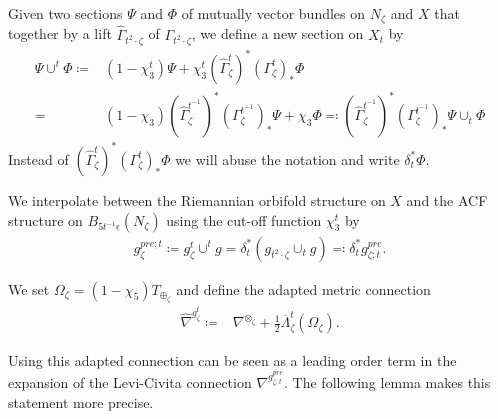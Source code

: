 \documentclass[psamsfonts]{amsart}
\theoremstyle{plain}
\theoremstyle{definition}{
\newtheorem{defi}{Definition}[section]
\newtheorem{ass}{Assumption}
\newtheorem*{nota}{Notation}}
\theoremstyle{remark}{
\newtheorem{rem}{Remark}
\newtheorem{ex}{Example}}
\theoremstyle{plain}{
\newtheorem{thm}{Theorem}[section]
\newtheorem{lem}{Lemma}[section]
\newtheorem{cor}{Corollary}[section]
\newtheorem{prop}{Proposition}[section]
\newtheorem{con}{Conjecture}[section]}
\newcommand{\und}[1]{\hspace{#1}\text{and}\hspace{#1}}
\begin{document}
\begin{nota}
Given two sections $\Psi$ and $\Phi$ of mutually vector bundles on $N_\zeta$ and $X$ that  together by a lift $\hat{\Gamma}_{t^2\cdot\zeta}$ of $ \Gamma_{t^2\cdot\zeta}$, we define a new section on $X_t$ by
\begin{align*}
    \Psi\cup^t\Phi\coloneqq&(1-\chi^t_3)\Psi+\chi^t_3(\hat{\Gamma}^t_\zeta)^*( \Gamma^t_\zeta)_*\Phi\\
    =&(1-\chi_3)(\hat{\Gamma}^{t^{-1}}_\zeta)^*( \Gamma^{t^{-1}}_\zeta)_*\Psi+\chi_3\Phi\eqqcolon (\hat{\Gamma}^{t^{-1}}_\zeta)^*( \Gamma^{t^{-1}}_\zeta)_*\Psi\cup_t\Phi
\end{align*}
Instead of $(\hat{\Gamma}^t_\zeta)^*( \Gamma^t_\zeta)_*\Phi$ we will abuse the notation and write $\delta_t^*\Phi$.
\end{nota}

\begin{defi}
    We interpolate between the Riemannian orbifold structure on $X$ and the ACF structure on $B_{5t^{-1}\epsilon}(N_\zeta)$ using the cut-off function ${\chi^t_3}$ by
\begin{align*}
    g^{pre;t}_\zeta\coloneqq g^t_{\zeta}\cup^t g =\delta_t^*(g_{t^2\cdot\zeta}\cup_t g)\eqqcolon \delta_t^*g^{pre}_{\zeta;t}.
\end{align*}
\end{defi}

\begin{defi}
We set $\Omega_\zeta=(1-\chi_5)T_{\oplus_\zeta}$
and define the adapted metric connection 
    \begin{align}
        \label{hatnablaoplustzeta}
    \widehat{\nabla}^{g^t_\zeta}\coloneqq&\nabla^{\otimes_\zeta}+\frac{1}{2}\overline{\Lambda}^t_\zeta(\Omega_\zeta).
    \end{align}
\end{defi}



Using this adapted connection can be seen as a leading order term in the expansion of the Levi-Civita connection $\nabla^{g_{\zeta;t}^{pre}}$. The following lemma makes this statement more precise.
\end{document}
